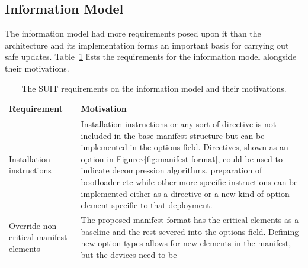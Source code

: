 \documentclass[0-thesis.tex]{subfiles}
\begin{document}
\subsection{Information Model}
\label{ssec:information-evaluation}
The information model had more requirements posed upon it than the architecture and its
implementation forms an important basis for carrying out safe updates.
Table~\ref{tab:information-evaluation} lists the requirements for the information model
alongside their motivations.

\begin{longtable}[]{@{}ll@{}}
    \caption{The SUIT requirements on the information model and their motivations.}
    \label{tab:information-evaluation}\\
    \toprule
    \begin{minipage}[b]{0.41\columnwidth}\raggedright\strut
    Requirement\strut
    \end{minipage} & \begin{minipage}[b]{0.53\columnwidth}\raggedright\strut
    Motivation\strut
    \end{minipage}\tabularnewline
    \midrule
    \endhead
    \begin{minipage}[t]{0.41\columnwidth}\raggedright\strut
    Installation instructions\strut
    \end{minipage} & \begin{minipage}[t]{0.53\columnwidth}\raggedright\strut
    Installation instructions or any sort of directive is not included in
    the base manifest structure but can be implemented in the options field.
    Directives, shown as an option in
    Figure\textasciitilde{}\ref{fig:manifest-format}, could be used to
    indicate decompression algorithms, preparation of bootloader etc while
    other more specific instructions can be implemented either as a
    directive or a new kind of option element specific to that
    deployment.\strut
    \end{minipage}\tabularnewline
    \begin{minipage}[t]{0.41\columnwidth}\raggedright\strut
    Override non-critical manifest elements\strut
    \end{minipage} & \begin{minipage}[t]{0.53\columnwidth}\raggedright\strut
    The proposed manifest format has the critical elements as a baseline and
    the rest severed into the options field. Defining new option types
    allows for new elements in the manifest, but the devices need to be

\end{minipage}
\end{longtable}
\end{document}
